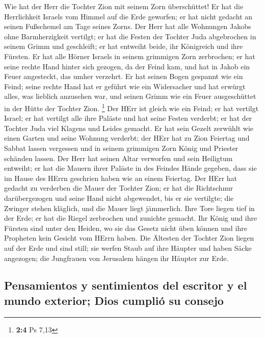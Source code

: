  Wie hat der Herr die Tochter Zion mit seinem Zorn
überschüttet! Er hat die Herrlichkeit Israels vom Himmel auf die Erde
geworfen; er hat nicht gedacht an seinen Fußschemel am Tage seines
Zorns.  Der Herr hat alle Wohnungen Jakobs ohne
Barmherzigkeit vertilgt; er hat die Festen der Tochter Juda abgebrochen
in seinem Grimm und geschleift; er hat entweiht beide, ihr Königreich
und ihre Fürsten.  Er hat alle Hörner Israels in seinem
grimmigen Zorn zerbrochen; er hat seine rechte Hand hinter sich gezogen,
da der Feind kam, und hat in Jakob ein Feuer angesteckt, das umher
verzehrt.  Er hat seinen Bogen gespannt wie ein Feind;
seine rechte Hand hat er geführt wie ein Widersacher und hat erwürgt
alles, was lieblich anzusehen war, und seinen Grimm wie ein Feuer
ausgeschüttet in der Hütte der Tochter Zion. \footnote{\textbf{2:4} Ps
  7,13}  Der HErr ist gleich wie ein Feind; er hat
vertilgt Israel; er hat vertilgt alle ihre Paläste und hat seine Festen
verderbt; er hat der Tochter Juda viel Klagens und Leides gemacht.
 Er hat sein Gezelt zerwühlt wie einen Garten und seine
Wohnung verderbt; der HErr hat zu Zion Feiertag und Sabbat lassen
vergessen und in seinem grimmigen Zorn König und Priester schänden
lassen.  Der Herr hat seinen Altar verworfen und sein
Heiligtum entweiht; er hat die Mauern ihrer Paläste in des Feindes Hände
gegeben, dass sie im Hause des HErrn geschrien haben wie an einem
Feiertag.  Der HErr hat gedacht zu verderben die Mauer der
Tochter Zion; er hat die Richtschnur darübergezogen und seine Hand nicht
abgewendet, bis er sie vertilgte; die Zwinger stehen kläglich, und die
Mauer liegt jämmerlich.  Ihre Tore liegen tief in der
Erde; er hat die Riegel zerbrochen und zunichte gemacht. Ihr König und
ihre Fürsten sind unter den Heiden, wo sie das Gesetz nicht üben können
und ihre Propheten kein Gesicht vom HErrn haben.  Die
Ältesten der Tochter Zion liegen auf der Erde und sind still; sie werfen
Staub auf ihre Häupter und haben Säcke angezogen; die Jungfrauen von
Jerusalem hängen ihr Häupter zur Erde.

\hypertarget{pensamientos-y-sentimientos-del-escritor-y-el-mundo-exterior-dios-cumpliuxf3-su-consejo}{%
\subsection{Pensamientos y sentimientos del escritor y el mundo
exterior; Dios cumplió su
consejo}\label{pensamientos-y-sentimientos-del-escritor-y-el-mundo-exterior-dios-cumpliuxf3-su-consejo}}

